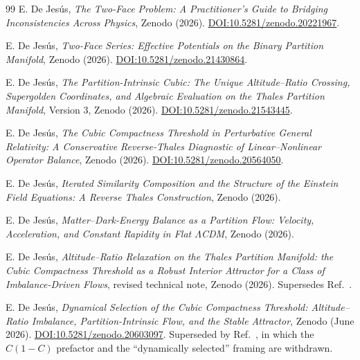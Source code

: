 \documentclass[11pt,a4paper]{article}
\theoremstyle{definition}
\theoremstyle{plain}
\theoremstyle{remark}
\begin{document}
\begin{thebibliography}{99}
E. De Jes\'us, \emph{The Two-Face Problem: A Practitioner's Guide to Bridging
Inconsistencies Across Physics}, Zenodo (2026).
\href{https://doi.org/10.5281/zenodo.20221967}{DOI:10.5281/zenodo.20221967}.

E. De Jes\'us, \emph{Two-Face Series: Effective Potentials on the Binary
Partition Manifold}, Zenodo (2026).
\href{https://doi.org/10.5281/zenodo.21430864}{DOI:10.5281/zenodo.21430864}.

E. De Jes\'us, \emph{The Partition-Intrinsic Cubic: The Unique Altitude--Ratio
Crossing, Supergolden Coordinates, and Algebraic Evaluation on the Thales
Partition Manifold}, Version 3, Zenodo (2026).
\href{https://doi.org/10.5281/zenodo.21543445}{DOI:10.5281/zenodo.21543445}.

E. De Jes\'us, \emph{The Cubic Compactness Threshold in Perturbative General
Relativity: A Conservative Reverse-Thales Diagnostic of Linear--Nonlinear
Operator Balance}, Zenodo (2026).
\href{https://doi.org/10.5281/zenodo.20564050}{DOI:10.5281/zenodo.20564050}.

E. De Jes\'us, \emph{Iterated Similarity Composition and the Structure of the
Einstein Field Equations: A Reverse Thales Construction}, Zenodo (2026).

E. De Jes\'us, \emph{Matter--Dark-Energy Balance as a Partition Flow: Velocity,
Acceleration, and Constant Rapidity in Flat $\Lambda$CDM}, Zenodo (2026).

E. De Jes\'us, \emph{Altitude--Ratio Relaxation on the Thales Partition
Manifold: the Cubic Compactness Threshold as a Robust Interior Attractor for a
Class of Imbalance-Driven Flows}, revised technical note, Zenodo (2026).
Supersedes Ref.~\cite{DynSelSuperseded}.

E. De Jes\'us, \emph{Dynamical Selection of the Cubic Compactness Threshold:
Altitude--Ratio Imbalance, Partition-Intrinsic Flow, and the Stable Attractor},
Zenodo (June 2026).
\href{https://doi.org/10.5281/zenodo.20603097}{DOI:10.5281/zenodo.20603097}.
Superseded by Ref.~\cite{AltitudeRelax}, in which the $C(1-C)$ prefactor and
the ``dynamically selected'' framing are withdrawn.


\end{thebibliography}
\end{document}
